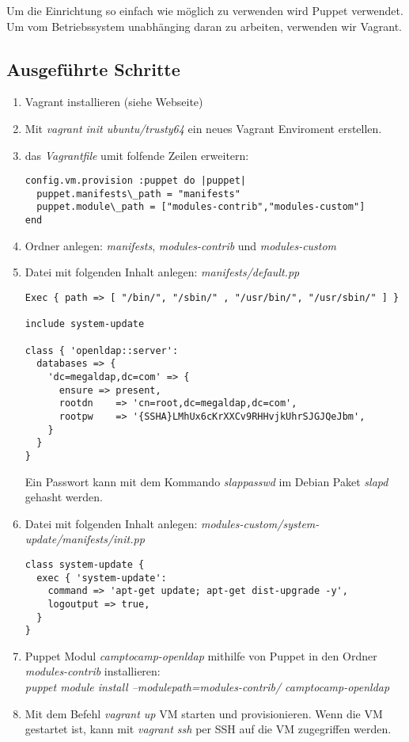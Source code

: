 \documentclass[main.tex]{subfiles}
\begin{document}
Um die Einrichtung so einfach wie möglich zu verwenden wird Puppet verwendet. Um vom Betriebssystem unabhänging daran zu arbeiten, verwenden wir Vagrant.

\subsection{Ausgeführte Schritte}
\begin{enumerate}
	\item Vagrant installieren (siehe Webseite)
	\item Mit \textit{vagrant init ubuntu/trusty64} ein neues Vagrant Enviroment erstellen.
	\item das \textit{Vagrantfile} umit folfende Zeilen erweitern: 
	\begin{lstlisting}
config.vm.provision :puppet do |puppet|
  puppet.manifests\_path = "manifests"
  puppet.module\_path = ["modules-contrib","modules-custom"]
end
	\end{lstlisting}
	\item Ordner anlegen: \textit{manifests}, \textit{modules-contrib} und \textit{modules-custom}
	\item Datei mit folgenden Inhalt anlegen: \textit{manifests/default.pp}
		\begin{lstlisting}
Exec { path => [ "/bin/", "/sbin/" , "/usr/bin/", "/usr/sbin/" ] }

include system-update

class { 'openldap::server':
  databases => {
    'dc=megaldap,dc=com' => {
      ensure => present,
      rootdn    => 'cn=root,dc=megaldap,dc=com',
      rootpw    => '{SSHA}LMhUx6cKrXXCv9RHHvjkUhrSJGJQeJbm',
    }
  }
}
		\end{lstlisting}
		Ein Passwort kann mit dem Kommando \textit{slappasswd} im Debian Paket \textit{slapd} gehasht werden.
		\item Datei mit folgenden Inhalt anlegen:
		\textit{modules-custom/system-update/manifests/init.pp}
		\begin{lstlisting}
class system-update {
  exec { 'system-update':
    command => 'apt-get update; apt-get dist-upgrade -y',
    logoutput => true,
  }
}
		\end{lstlisting}
		\item Puppet Modul \textit{camptocamp-openldap} mithilfe von Puppet in den Ordner \textit{modules-contrib} installieren:\\ \textit{puppet module install --modulepath=modules-contrib/ camptocamp-openldap}
		\item Mit dem Befehl \textit{vagrant up} VM starten und provisionieren. Wenn die VM gestartet ist, kann mit \textit{vagrant ssh} per SSH auf die VM zugegriffen werden.
\end{enumerate}
\end{document}
